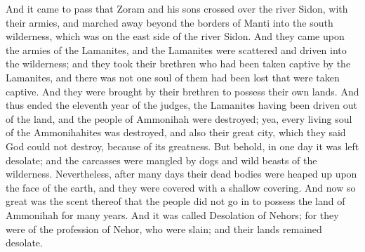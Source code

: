 \bverse \iffalse And it came to pass that Zoram and his sons crossed over the river Sidon, with their armies, and marched away beyond the borders of Manti into the south wilderness, which was on the east side of the river Sidon. \fi
And it came to pass that Zoram and his sons crossed over the river Sidon, with their armies, and marched away beyond the borders of Manti into the south wilderness, which was on the east side of the river Sidon.
\bverse \iffalse And they came upon the armies of the Lamanites, and the Lamanites were scattered and driven into the wilderness; and they took their brethren who had been taken captive by the Lamanites, and there was not one soul of them had been lost that were taken captive. And they were brought by their brethren to possess their own lands. \fi
And they came upon the armies of the Lamanites, and the Lamanites were scattered and driven into the wilderness; and they took their brethren who had been taken captive by the Lamanites, and there was not one soul of them had been lost that were taken captive. And they were brought by their brethren to possess their own lands.
\bverse \iffalse And thus ended the eleventh year of the judges, the Lamanites having been driven out of the land, and the people of Ammonihah were destroyed; yea, every living soul of the Ammonihahites was destroyed, and also their great city, which they said God could not destroy, because of its greatness. \fi
And thus ended the eleventh year of the judges, the Lamanites having been driven out of the land, and the people of Ammonihah were destroyed; yea, every living soul of the Ammonihahites was destroyed, and also their great city, which they said God could not destroy, because of its greatness.
\bverse \iffalse But behold, in one day it was left desolate; and the carcasses were mangled by dogs and wild beasts of the wilderness. \fi
But behold, in one day it was left desolate; and the carcasses were mangled by dogs and wild beasts of the wilderness.
\bverse \iffalse Nevertheless, after many days their dead bodies were heaped up upon the face of the earth, and they were covered with a shallow covering. And now so great was the scent thereof that the people did not go in to possess the land of Ammonihah for many years. And it was called Desolation of Nehors; for they were of the profession of Nehor, who were slain; and their lands remained desolate. \fi
Nevertheless, after many days their dead bodies were heaped up upon the face of the earth, and they were covered with a shallow covering. And now so great was the scent thereof that the people did not go in to possess the land of Ammonihah for many years. And it was called Desolation of Nehors; for they were of the profession of Nehor, who were slain; and their lands remained desolate.
